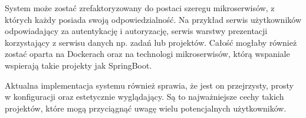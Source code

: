 System może zostać zrefaktoryzowany do postaci szeregu mikroserwisów, z których każdy posiada swoją odpowiedzialność. Na przykład serwis użytkowników odpowiadający za autentykację i autoryzację, serwis warstwy prezentacji korzystający z serwisu danych np. zadań lub projektów. Całość mogłaby również zostać oparta na Dockerach oraz na technologi mikroserwisów, którą wspaniale wspierają takie projekty jak SpringBoot.

Aktualna implementacja systemu również sprawia, że jest on przejrzysty, prosty w konfiguracji oraz estetycznie wyglądający. Są to najważniejsze cechy takich projektów, które mogą przyciągnąć uwagę wielu potencjalnych użytkowników.
